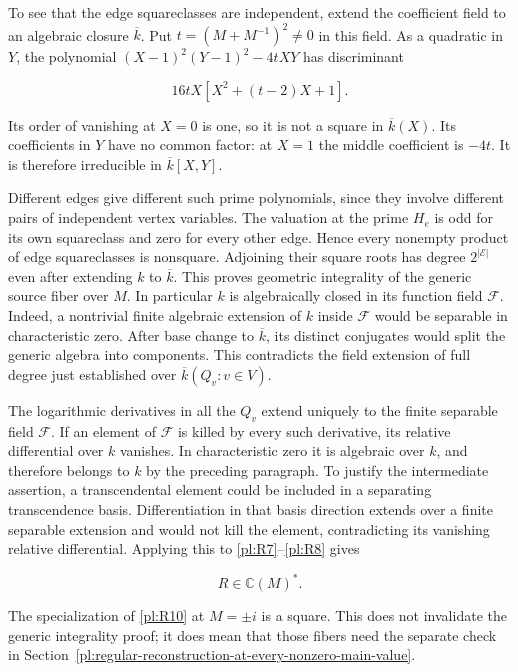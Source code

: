 To see that the edge squareclasses are independent, extend the
coefficient field to an algebraic closure \(\overline{k}\).
Put \(t=(M+M^{-1})^2\ne0\) in this field. As a quadratic in
\(Y\), the polynomial
\((X-1)^2(Y-1)^2-4tXY\) has discriminant

\begin{equation}\label{pl:R11}
16tX[X^2+(t-2)X+1].
\end{equation}

Its order of vanishing at \(X=0\) is one, so it is not a square
in \(\overline{k}(X)\). Its coefficients in \(Y\) have no
common factor: at \(X=1\) the middle coefficient is \(-4t\).
It is therefore irreducible in \(\overline{k}[X,Y]\).

Different edges give different such prime polynomials, since they
involve different pairs of independent vertex variables. The valuation
at the prime \(H_e\) is odd for its own squareclass and zero for
every other edge. Hence every nonempty product of edge squareclasses
is nonsquare. Adjoining their square roots has degree \(2^{|\mathcal E|}\)
even after extending \(k\) to \(\overline{k}\). This proves
geometric integrality of the generic source fiber over \(M\).
In particular \(k\) is algebraically closed in its function
field \(\mathcal F\).
Indeed, a nontrivial finite algebraic extension of \(k\) inside
\(\mathcal F\) would be separable in characteristic zero. After
base change to \(\overline k\), its distinct conjugates would split
the generic algebra into components. This contradicts the field
extension of full degree just established over
\(\overline k(Q_v:v\in V)\).

The logarithmic derivatives in all the \(Q_v\) extend uniquely
to the finite separable field \(\mathcal F\). If an element of
\(\mathcal F\) is killed by every such derivative, its relative
differential over \(k\) vanishes. In characteristic zero it is
algebraic over \(k\), and therefore belongs to \(k\) by the
preceding paragraph. To justify the intermediate assertion, a
transcendental element could be included in a separating
transcendence basis. Differentiation in that basis direction
extends over a finite separable extension and would not kill the
element, contradicting its vanishing relative differential.
Applying this to \eqref{pl:R7}--\eqref{pl:R8} gives

\begin{equation}\label{pl:R12}
R\in\mathbb C(M)^*.
\end{equation}

The specialization of \eqref{pl:R10} at \(M=\pm i\) is a square. This
does not invalidate the generic integrality proof; it does mean that
those fibers need the separate check in Section~\ref{pl:regular-reconstruction-at-every-nonzero-main-value}.
